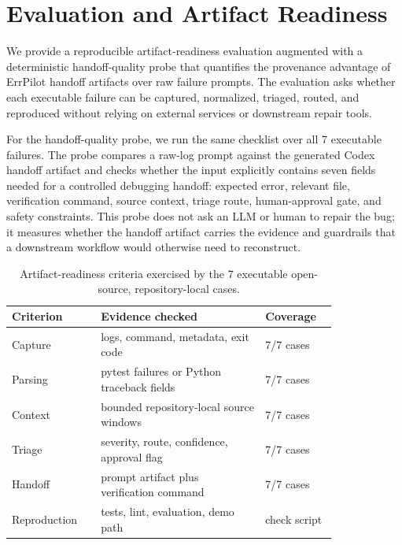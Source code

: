 \documentclass[sigconf]{acmart}
\begin{document}
\section{Evaluation and Artifact Readiness}

We provide a reproducible artifact-readiness evaluation augmented with a
deterministic handoff-quality probe that quantifies the provenance advantage of
ErrPilot handoff artifacts over raw failure prompts. The evaluation asks whether
each executable failure can be captured, normalized, triaged, routed, and
reproduced without relying on external services or downstream repair tools.

For the handoff-quality probe, we run the same checklist over all 7 executable
failures. The
probe compares a raw-log prompt against the generated Codex handoff artifact
and checks whether the input explicitly contains seven fields needed for a
controlled debugging handoff: expected error, relevant file, verification
command, source context, triage route, human-approval gate, and safety
constraints. This probe does not ask an LLM or human to repair the bug; it
measures whether the handoff artifact carries the evidence and guardrails that a
downstream workflow would otherwise need to reconstruct.

\begin{table}[t]
  \caption{Artifact-readiness criteria exercised by the 7 executable
  open-source, repository-local cases.}
  \label{tab:evaluation}
  \small
  \begin{tabular}{p{0.22\linewidth}p{0.43\linewidth}p{0.17\linewidth}}
    \toprule
    Criterion & Evidence checked & Coverage \\
    \midrule
    Capture & logs, command, metadata, exit code & 7/7 cases \\
    Parsing & pytest failures or Python traceback fields & 7/7 cases \\
    Context & bounded repository-local source windows & 7/7 cases \\
    Triage & severity, route, confidence, approval flag & 7/7 cases \\
    Handoff & prompt artifact plus verification command & 7/7 cases \\
    Reproduction & tests, lint, evaluation, demo path & check script \\
    \bottomrule
  \end{tabular}
\end{table}
\end{document}

